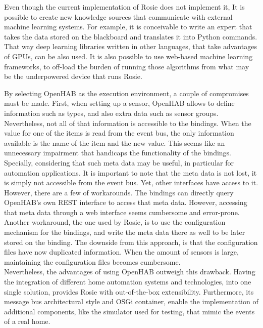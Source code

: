 Even though the current implementation of Rosie does not implement it, It is possible to create new knowledge sources that communicate with external machine learning systems. For example, it is conceivable to write an expert that takes the data stored on the blackboard and translates it into Python commands. That way deep learning libraries written in other languages, that take advantages of GPUs, can be also used. It is also possible to use web-based machine learning frameworks, to off-load the burden of running those algorithms from what may be the underpowered device that runs Rosie.

By selecting OpenHAB as the execution environment, a couple of compromises must be made. First, when setting up a sensor, OpenHAB allows to define information such as types, and also extra data such as sensor groups. Nevertheless, not all of that information is accessible to the bindings. When the value for one of the items is read from the event bus, the only information available is the name of the item and the new value. This seems like an unnecessary impairment that handicaps the functionality of the bindings. Specially, considering that such meta data may be useful, in particular for automation applications. It is important to note that the meta data is not lost, it is simply not accessible from the event bus. Yet, other interfaces have access to it. However, there are a few of workarounds. The bindings can directly query OpenHAB's own REST interface to access that meta data. However, accessing that meta data through a web interface seems cumbersome and error-prone. \\
Another workaround, the one used by Rosie, is to use the configuration mechanism for the bindings, and write the meta data there as well to be later stored on the binding. The downside from this approach, is that the configuration files have now duplicated information. When the amount of sensors is large, maintaining the configuration files becomes cumbersome.\\
Nevertheless, the advantages of using OpenHAB outweigh this drawback. Having the integration of different home automation systems and technologies, into one single solution, provides Rosie with out-of-the-box extensibility. Furthermore, its message bus architectural style and OSGi container,  enable the implementation of additional components, like the simulator used for testing, that mimic the events of a real home.

